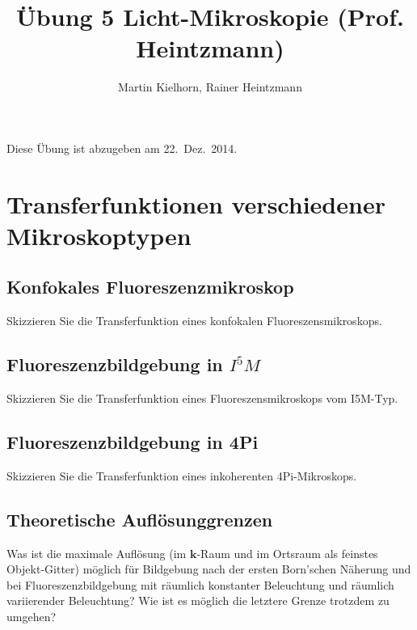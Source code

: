 \documentclass{article}
\begin{document}
\author{Martin Kielhorn, Rainer Heintzmann}
\title{\"Ubung 5 Licht-Mikroskopie (Prof. Heintzmann)}
\maketitle
\noindent Diese \"Ubung ist abzugeben am 22.~Dez.~2014.

\section{Transferfunktionen verschiedener Mikroskoptypen}
\subsection*{Konfokales Fluoreszenzmikroskop}
Skizzieren Sie die Transferfunktion eines konfokalen Fluoreszensmikroskops.
\subsection*{Fluoreszenzbildgebung in $I^5M$}
Skizzieren Sie die Transferfunktion eines Fluoreszensmikroskops vom I5M-Typ.
\subsection*{Fluoreszenzbildgebung in 4Pi}
Skizzieren Sie die Transferfunktion eines inkoherenten 4Pi-Mikroskops.

\subsection*{Theoretische Aufl\"osunggrenzen}

Was ist die maximale Aufl\"osung (im $\mathbf{k}$-Raum und im Ortsraum als feinstes Objekt-Gitter) m\"oglich f\"ur Bildgebung nach der ersten Born'schen Näherung und bei Fluoreszenzbildgebung mit räumlich konstanter Beleuchtung und räumlich variierender Beleuchtung? Wie ist es möglich die letztere Grenze trotzdem zu umgehen?
\end{document}
